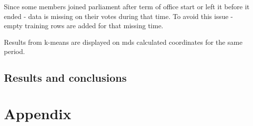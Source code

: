\documentclass[a4paper,12pt]{article}
\begin{document}
   	Since some members joined parliament after term of office start or left it before it ended - data is missing on their votes during that time. To avoid this issue - empty training rows are added for that missing time.
   	
	Results from \gls{k-means} are displayed on \acrshort{mds} calculated coordinates for the same period.
   	
   	\subsection{Results and conclusions}
    
   
    \clearpage
    
    {}
    
        
    \clearpage
    
      
	\appendix
	\section{Appendix}
    
    
\end{document}
